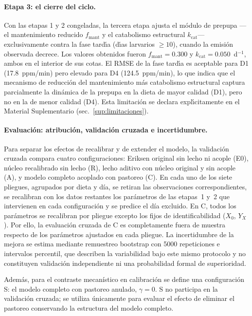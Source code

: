 \paragraph{Etapa 3: el cierre del ciclo.}
Con las etapas 1 y 2 congeladas, la tercera etapa ajusta el m\'{o}dulo de prepupa ---el mantenimiento reducido $f_{\mathrm{mant}}$ y el catabolismo estructural $k_{\mathrm{cat}}$--- exclusivamente contra la fase tard\'{\i}a (d\'{\i}as larvarios $\geq 10$), cuando la emisi\'{o}n observada decrece. Los valores obtenidos fueron $f_{\mathrm{mant}} = 0.300$ y $k_{\mathrm{cat}} = 0.050$~d$^{-1}$, ambos en el interior de sus cotas. El RMSE de la fase tard\'{\i}a es aceptable para D1 (17.8~ppm/min) pero elevado para D4 (124.5~ppm/min), lo que indica que el mecanismo de reducci\'{o}n del mantenimiento m\'{a}s catabolismo estructural captura parcialmente la din\'{a}mica de la prepupa en la dieta de mayor calidad (D1), pero no en la de menor calidad (D4). Esta limitaci\'{o}n se declara expl\'{\i}citamente en el Material Suplementario (sec.~\ref{sup:limitaciones}).

\paragraph{Evaluación: atribución, validación cruzada e incertidumbre.}
Para separar los efectos de recalibrar y de extender el modelo, la validación cruzada compara cuatro configuraciones: Eriksen original sin lecho ni acople (E0), núcleo recalibrado sin lecho (R), lecho aditivo con núcleo original y sin acople (A), y modelo completo acoplado con pastoreo (C). En cada uno de los siete pliegues, agrupados por dieta y día, se retiran las observaciones correspondientes, se recalibran con los datos restantes los parámetros de las etapas~1 y~2 que intervienen en cada configuración y se predice el día excluido. En C, todos los par\'{a}metros se recalibran por pliegue excepto los fijos de identificabilidad ($X_0$, $Y_X$). Por ello, la evaluaci\'{o}n cruzada de C es completamente fuera de muestra respecto de los par\'{a}metros ajustados en cada pliegue. La incertidumbre de la mejora se estima mediante remuestreo bootstrap con 5000 repeticiones e intervalos percentil, que describen la variabilidad bajo este mismo protocolo y no constituyen validación independiente ni una probabilidad formal de superioridad.

Además, para el contraste mecanístico en calibración se define una configuración S: el modelo completo con pastoreo anulado, $\gamma = 0$. S no participa en la validación cruzada; se utiliza únicamente para evaluar el efecto de eliminar el pastoreo conservando la estructura del modelo completo.

